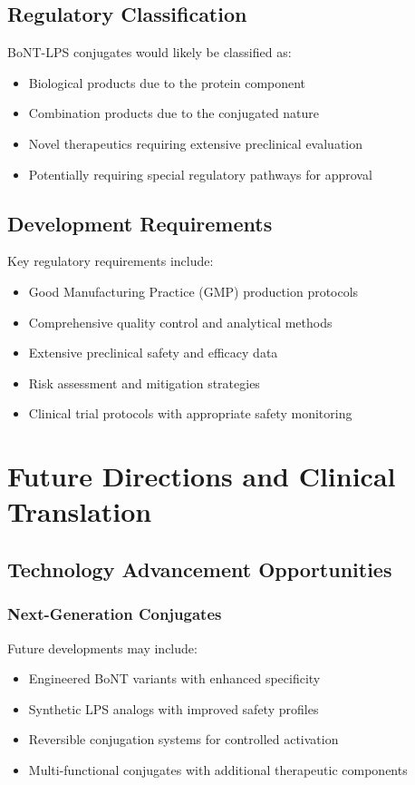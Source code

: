 \documentclass[11pt,a4paper]{article}
\begin{document}
\subsection{Regulatory Classification}

BoNT-LPS conjugates would likely be classified as:
\begin{itemize}
\item Biological products due to the protein component
\item Combination products due to the conjugated nature
\item Novel therapeutics requiring extensive preclinical evaluation
\item Potentially requiring special regulatory pathways for approval
\end{itemize}

\subsection{Development Requirements}

Key regulatory requirements include:
\begin{itemize}
\item Good Manufacturing Practice (GMP) production protocols
\item Comprehensive quality control and analytical methods
\item Extensive preclinical safety and efficacy data
\item Risk assessment and mitigation strategies
\item Clinical trial protocols with appropriate safety monitoring
\end{itemize}

\section{Future Directions and Clinical Translation}

\subsection{Technology Advancement Opportunities}

\subsubsection{Next-Generation Conjugates}

Future developments may include:
\begin{itemize}
\item Engineered BoNT variants with enhanced specificity
\item Synthetic LPS analogs with improved safety profiles
\item Reversible conjugation systems for controlled activation
\item Multi-functional conjugates with additional therapeutic components
\end{itemize}
\end{document}
